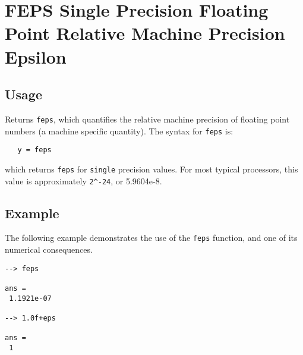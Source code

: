 \section{FEPS Single Precision Floating Point Relative Machine Precision Epsilon}

\subsection{Usage}

Returns \verb|feps|, which quantifies the relative machine precision
of floating point numbers (a machine specific quantity).  The syntax
for \verb|feps| is:
\begin{verbatim}
   y = feps
\end{verbatim}
which returns \verb|feps| for \verb|single| precision values. For most
typical processors, this value is approximately \verb|2^-24|, or 5.9604e-8.
\subsection{Example}

The following example demonstrates the use of the \verb|feps| function,
and one of its numerical consequences.
\begin{verbatim}
--> feps

ans = 
 1.1921e-07 

--> 1.0f+eps

ans = 
 1 
\end{verbatim}
